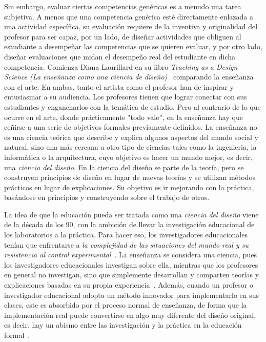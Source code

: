Sin embargo, evaluar ciertas competencias genéricas es a menudo una tarea subjetiva. A menos que una competencia genérica esté directamente enlazada a una actividad específica, su evaluación requiere de la inventiva y originalidad del profesor para ser capaz, por un lado, de diseñar actividades que obliguen al estudiante a desempeñar las competencias que se quieren evaluar, y por otro lado, diseñar evaluaciones que midan el desempeño real del estudiante en dicha competencia. Comienza Diana Laurillard en su libro \emph{Teaching as a Design Science (La enseñanza como una ciencia de diseño)}~\cite{laurillard2012teaching} comparando la enseñanza con el arte. En ambas, tanto el artista como el profesor han de inspirar y entusiasmar a su audiencia. Los profesores tienen que lograr conectar con sus estudiantes y engancharlos con la temática de estudio. Pero al contrario de lo que ocurre en el arte, donde prácticamente "todo vale'', en la enseñanza hay que ceñirse a una serie de objetivos formales previamente definidos. La enseñanza no es una ciencia teórica que describe y explica algunos aspectos del mundo social y natural, sino una más cercana a otro tipo de ciencias tales como la ingenieria, la informática o la arquitectura, cuyo objetivo es hacer un mundo mejor, es decir, una \emph{ciencia del diseño}. En la ciencia del diseño se parte de la teoría, pero se construyen principios de diseño en lugar de nuevas teorías y se utilizan métodos prácticos en lugar de explicaciones. Su objetivo es ir mejorando con la práctica, basándose en principios y construyendo sobre el trabajo de otros.

La idea de que la educación pueda ser tratada como una \emph{ciencia del diseño} viene de la década de los 90, con la ambición de llevar la investigación educacional de los laboratorios a la práctica. Para hacer eso, los investigadores educacionales tenían que enfrentarse a \emph{la complejidad de las situaciones del mundo real y su resistencia al control experimental}~\cite{collins2004design}. La enseñanza se considera una ciencia, pues los investigadores educacionales investigan sobre ella, mientras que los profesores en general no investigan, sino que simplemente desarrollan y comparten teorías y explicaciones basadas en su propia experiencia~\cite{laurillard2012teaching}. Además, cuando un profesor o investigador educacional adopta un método innovador para implementarlo en sus clases, este es absorbido por el proceso normal de enseñanza, de forma que la implementación real puede convertirse en algo muy diferente del diseño original, es decir, hay un abismo entre las investigación y la práctica en la educación formal~\cite{anderson2012design}. 

